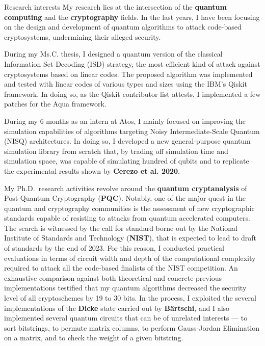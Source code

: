 \documentclass{resume} %
\begin{document}
\begin{rSection}{Research interests}
  My research lies at the intersection of the \textbf{quantum computing} and the
  \textbf{cryptography} fields. In the last years, I have been focusing on the
  design and development of quantum algorithms to attack code-based
  cryptosystems, undermining their alleged security.

  During my Ms.C. thesis, I designed a quantum version of the classical
  Information Set Decoding (ISD) strategy, the most efficient kind of attack
  against cryptosystems based on linear codes. The proposed algorithm was
  implemented and tested with linear codes of various types and sizes using the
  IBM's Qiskit framework. In doing so, as the Qiskit contributor list attests, I
  implemented a few patches for the Aqua framework.

  During my 6 months as an intern at Atos, I mainly focused on improving the
  simulation capabilities of algorithms targeting Noisy Intermediate-Scale
  Quantum (NISQ) architectures. In doing so, I developed a new general-purpose
  quantum simulation library from scratch that, by trading off simulation time
  and simulation space, was capable of simulating hundred of qubits and to
  replicate the experimental results shown by \textbf{Cerezo et al. 2020}.

  My Ph.D.\ research activities revolve around the \textbf{quantum
    cryptanalysis} of Post-Quantum Cryptography (\textbf{PQC}). Notably, one of
  the major quest in the quantum and cryptography communities is the assessment
  of new cryptographic standards capable of resisting to attacks from quantum
  accelerated computers. The search is witnessed by the call for standard borne
  out by the National Institute of Standards and Technology (\textbf{NIST}),
  that is expected to lead to draft of standards by the end of 2023. For this
  reason, I conducted practical evaluations in terms of circuit width and depth
  of the computational complexity required to attack all the code-based
  finalists of the NIST competition. An exhaustive comparison against both
  theoretical and concrete previous implementations testified that my quantum
  algorithms decreased the security level of all cryptoschemes by 19 to 30 bits.
  In the process, I exploited the several implementations of the \textbf{Dicke}
  state carried out by \textbf{B{\"a}rtschi}, and I also implemented several
  quantum circuits that can be of unrelated interests --- to sort bitstrings, to
  permute matrix columns, to perform Gauss-Jordan Elimination on a matrix, and
  to check the weight of a given bitstring.


\end{rSection}
\end{document}
